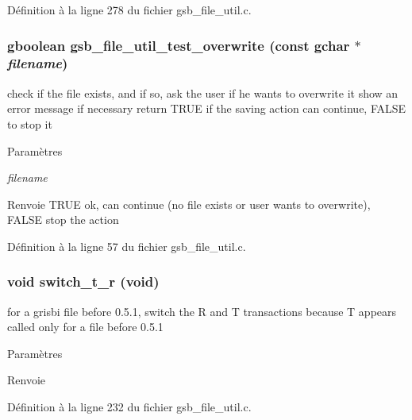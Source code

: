 Définition à la ligne 278 du fichier gsb\_\-file\_\-util.c.

\subsubsection[{gsb\_\-file\_\-util\_\-test\_\-overwrite}]{\setlength{\rightskip}{0pt plus 5cm}gboolean gsb\_\-file\_\-util\_\-test\_\-overwrite (const gchar $\ast$ {\em filename})}\label{gsb__file__util_8h_af69c587f1e5d21b56fe1c8f53b32565a}
check if the file exists, and if so, ask the user if he wants to overwrite it show an error message if necessary return TRUE if the saving action can continue, FALSE to stop it


\begin{DoxyParams}{Paramètres}
\item[{\em filename}]\end{DoxyParams}
\begin{DoxyReturn}{Renvoie}
TRUE ok, can continue (no file exists or user wants to overwrite), FALSE stop the action 
\end{DoxyReturn}


Définition à la ligne 57 du fichier gsb\_\-file\_\-util.c.

\subsubsection[{switch\_\-t\_\-r}]{\setlength{\rightskip}{0pt plus 5cm}void switch\_\-t\_\-r (void)}\label{gsb__file__util_8h_ae79b0f000a8686ec053bddcd2f0c1d35}
for a grisbi file before 0.5.1, switch the R and T transactions because T appears called only for a file before 0.5.1


\begin{DoxyParams}{Paramètres}
\item[{\em }]\end{DoxyParams}
\begin{DoxyReturn}{Renvoie}

\end{DoxyReturn}


Définition à la ligne 232 du fichier gsb\_\-file\_\-util.c.

